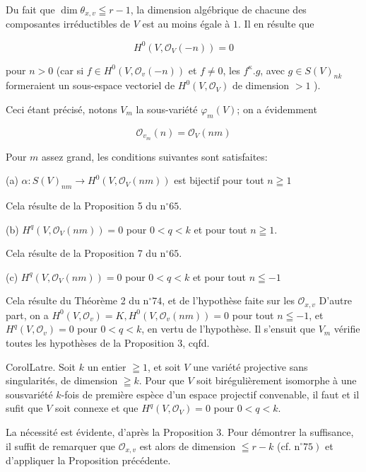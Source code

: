 Du fait que $\operatorname{dim} \mathcal{\theta}_{x, v} \leqq r-1$, la dimension algébrique de chacune des composantes irréductibles de $V$ est au moins égale à $1 .$ Il en résulte que

$$
H^{0}\left(V, \mathcal{O}_{V}(-n)\right)=0
$$

pour $n>0$ (car si $f \in H^{0}\left(V, \mathcal{O}_{v}(-n)\right)$ et $f \neq 0$, les $f^{\kappa} . g$, avec $g \in S(V)_{n k}$ formeraient un sous-espace vectoriel de $H^{0}\left(V, \mathcal{O}_{V}\right)$ de dimension $>1$ ).

Ceci étant précisé, notons $V_{m}$ la sous-variété $\varphi_{m}(V)$; on a évidemment

$$
\mathcal{O}_{v_{m}}(n)=\mathcal{O}_{V}(n m)
$$

Pour $m$ assez grand, les conditions suivantes sont satisfaites:

(a) $\alpha: S(V)_{n m} \rightarrow H^{0}\left(V, \mathcal{O}_{V}(n m)\right)$ est bijectif pour tout $n \geqq 1$

Cela résulte de la Proposition 5 du $\mathrm{n}^{\circ} 65$.

(b) $H^{q}\left(V, \mathcal{O}_{V}(n m)\right)=0$ pour $0<q<k$ et pour tout $n \geqq 1$.

Cela résulte de la Proposition 7 du $\mathrm{n}^{\circ} 65$.

(c) $H^{q}\left(V, \mathcal{O}_{V}(n m)\right)=0$ pour $0<q<k$ et pour tout $n \leqq-1$

Cela résulte du Théorème 2 du $\mathrm{n}^{\circ} 74$, et de l'hypothèse faite sur les $\mathcal{O}_{x, v}$ D'autre part, on a $H^{0}\left(V, \mathcal{O}_{v}\right)=K, H^{0}\left(V, \mathcal{O}_{v}(n m)\right)=0$ pour tout $n \leqq-1$, et $H^{q}\left(V, \mathcal{O}_{v}\right)=0$ pour $0<q<k$, en vertu de l'hypothèse. Il s'ensuit que $V_{m}$ vérifie toutes les hypothèses de la Proposition 3, cqfd.

CorolLatre. Soit $k$ un entier $\geqq 1$, et soit $V$ une variété projective sans singularités, de dimension $\geqq k$. Pour que $V$ soit birégulièrement isomorphe à une sousvariété $k$-fois de première espèce d'un espace projectif convenable, il faut et il sufit que $V$ soit connexe et que $H^{q}\left(V, \mathcal{O}_{V}\right)=0$ pour $0<q<k$.

La nécessité est évidente, d'après la Proposition 3. Pour démontrer la suffisance, il suffit de remarquer que $\mathcal{O}_{x, v}$ est alors de dimension $\leqq r-k$ (cf. $\left.\mathrm{n}^{\circ} 75\right)$ et d'appliquer la Proposition précédente.

